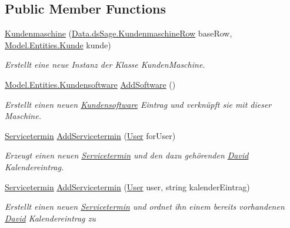 \subsection*{Public Member Functions}
\begin{DoxyCompactItemize}
\item 
\hyperlink{class_products_1_1_model_1_1_entities_1_1_kundenmaschine_a06cec8ef466c439b12e21862d0c0e198}{Kundenmaschine} (\hyperlink{class_products_1_1_data_1_1ds_sage_1_1_kundenmaschine_row}{Data.\+ds\+Sage.\+Kundenmaschine\+Row} base\+Row, \hyperlink{class_products_1_1_model_1_1_entities_1_1_kunde}{Model.\+Entities.\+Kunde} kunde)
\begin{DoxyCompactList}\small\item\em Erstellt eine neue Instanz der Klasse Kunden\+Maschine. \end{DoxyCompactList}\item 
\hyperlink{class_products_1_1_model_1_1_entities_1_1_kundensoftware}{Model.\+Entities.\+Kundensoftware} \hyperlink{class_products_1_1_model_1_1_entities_1_1_kundenmaschine_a43f0ca53a1990122c36c20b06ae3fe75}{Add\+Software} ()
\begin{DoxyCompactList}\small\item\em Erstellt einen neuen \hyperlink{class_products_1_1_model_1_1_entities_1_1_kundensoftware}{Kundensoftware} Eintrag und verknüpft sie mit dieser Maschine. \end{DoxyCompactList}\item 
\hyperlink{class_products_1_1_model_1_1_entities_1_1_servicetermin}{Servicetermin} \hyperlink{class_products_1_1_model_1_1_entities_1_1_kundenmaschine_a6b5ba09d2ca3c75d9e89dcbaaf1f5cd2}{Add\+Servicetermin} (\hyperlink{class_products_1_1_model_1_1_entities_1_1_user}{User} for\+User)
\begin{DoxyCompactList}\small\item\em Erzeugt einen neuen \hyperlink{class_products_1_1_model_1_1_entities_1_1_servicetermin}{Servicetermin} und den dazu gehörenden \hyperlink{namespace_david}{David} Kalendereintrag. \end{DoxyCompactList}\item 
\hyperlink{class_products_1_1_model_1_1_entities_1_1_servicetermin}{Servicetermin} \hyperlink{class_products_1_1_model_1_1_entities_1_1_kundenmaschine_a2f6945098faab57e49663bb2137ddf59}{Add\+Servicetermin} (\hyperlink{class_products_1_1_model_1_1_entities_1_1_user}{User} user, string kalender\+Eintrag)
\begin{DoxyCompactList}\small\item\em Erstellt einen neuen \hyperlink{class_products_1_1_model_1_1_entities_1_1_servicetermin}{Servicetermin} und ordnet ihn einem bereits vorhandenen \hyperlink{namespace_david}{David} Kalendereintrag zu \end{DoxyCompactList}\item 

\end{DoxyCompactItemize}
